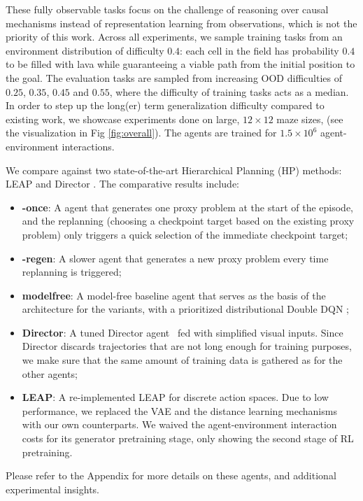 These fully observable tasks focus on the challenge of reasoning over causal mechanisms instead of  representation learning from observations, which is not the priority of this work. Across all experiments, we sample training tasks from an environment distribution of difficulty $0.4$: each cell in the field has probability $0.4$ to be filled with lava while guaranteeing a viable path from the initial position to the goal. The evaluation tasks are sampled from increasing OOD difficulties of $0.25$, $0.35$, $0.45$ and $0.55$, where the difficulty of training tasks acts as a median. In order to step up the long(er) term generalization difficulty compared to existing work, we showcase experiments done on large, $12 \times 12$ maze sizes, (see the visualization in Fig \ref{fig:overall}). The agents are trained for $1.5 \times 10^{6}$ agent-environment interactions. 

We compare \agentshort{} against two state-of-the-art Hierarchical Planning (HP) methods: LEAP \citep{nasiriany2019planning} and Director \citep{hafner2022deep}. The comparative results include:

\begin{itemize}[label={},leftmargin=*]
    \item \textbf{\agentshort{}-once}: A \agentshort{} agent that generates one proxy problem at the start of the episode, and the replanning (choosing a checkpoint target based on the existing proxy problem) only triggers a quick selection of the immediate checkpoint target;
    \item \textbf{\agentshort{}-regen}: A slower \agentshort{} agent that generates a new proxy problem every time replanning is triggered;
    \item \textbf{modelfree}: A model-free baseline agent that serves as the basis of the architecture for the \agentshort{} variants, with a prioritized distributional Double DQN \citep{schaul2016prioritized,dabney2018distributional,vanhasselt2015deep};
    \item \textbf{Director}: A tuned Director agent~\citep{hafner2022deep} fed with simplified visual inputs. Since Director discards trajectories that are not long enough for training purposes, we make sure that the same amount of training data is gathered as for the other agents;
    \item \textbf{LEAP}: A re-implemented LEAP for discrete action spaces. Due to low performance, we replaced the VAE and the distance learning mechanisms with our own counterparts. We waived the agent-environment interaction costs for its generator pretraining stage, only showing the second stage of RL pretraining.
\end{itemize}
Please refer to the Appendix for more details on these agents, and additional experimental insights.

